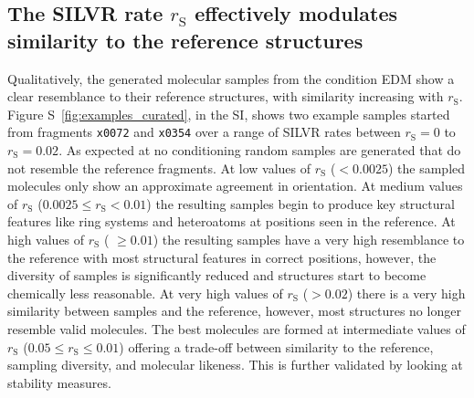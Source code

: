 \documentclass[journal=jacsat,manuscript=article]{achemso}
\begin{document}
\subsection{The SILVR rate $r_{\mathrm{S}}$ effectively modulates similarity to the reference structures}
Qualitatively, the generated molecular samples from the condition EDM  show a clear resemblance to their reference structures, with similarity increasing with $r_{\mathrm{S}}$. Figure S~\ref{fig:examples_curated}, in the SI, shows two example samples started from fragments \texttt{x0072} and \texttt{x0354} over a range of SILVR rates between $r_{\mathrm{S}}=0$ to $r_{\mathrm{S}}=0.02$. As expected at no conditioning random samples are generated that do not resemble the reference fragments.  At low values of $r_{\mathrm{S}}$ ($< 0.0025$) the sampled molecules only show an approximate agreement in orientation. At medium values of $r_{\mathrm{S}}$ ($0.0025 \le r_{\mathrm{S}} < 0.01$) the resulting samples begin to produce key structural features like ring systems and heteroatoms at positions seen in the reference. At high values of $r_{\mathrm{S}}$ ( $\ge 0.01$) the resulting samples have a very high resemblance to the reference with most structural features in correct positions, however, the diversity of samples is significantly reduced and structures start to become chemically less reasonable. At very high values of $r_{\mathrm{S}}$ ($> 0.02$) there is a very high similarity between samples and the reference, however, most structures no longer resemble valid molecules. The best molecules are formed at intermediate values of $r_{\mathrm{S}}$ ($0.05 \le r_{\mathrm{S}} \le 0.01$) offering a trade-off between similarity to the reference, sampling diversity, and molecular likeness. This is further validated by looking at stability measures. 
\end{document}
